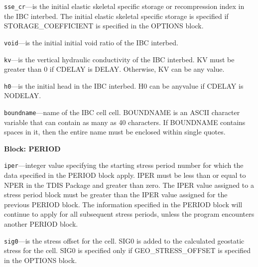 \begin{description}
\item \texttt{sse\_cr}---is the initial elastic skeletal specific storage or recompression index in the IBC interbed. The initial elastic skeletal specific storage is specified if STORAGE\_COEFFICIENT is specified in the OPTIONS block.

\item \texttt{void}---is the initial initial void ratio of the IBC interbed.

\item \texttt{kv}---is the vertical hydraulic conductivity of the IBC interbed. KV must be greater than 0 if CDELAY is DELAY. Otherwise, KV can be any value.

\item \texttt{h0}---is the initial head in the IBC interbed. H0 can be anyvalue if CDELAY is NODELAY.

\item \texttt{boundname}---name of the IBC cell cell.  BOUNDNAME is an ASCII character variable that can contain as many as 40 characters.  If BOUNDNAME contains spaces in it, then the entire name must be enclosed within single quotes.

\end{description}
\item \textbf{Block: PERIOD}

\begin{description}
\item \texttt{iper}---integer value specifying the starting stress period number for which the data specified in the PERIOD block apply.  IPER must be less than or equal to NPER in the TDIS Package and greater than zero.  The IPER value assigned to a stress period block must be greater than the IPER value assigned for the previous PERIOD block.  The information specified in the PERIOD block will continue to apply for all subsequent stress periods, unless the program encounters another PERIOD block.

\item \texttt{sig0}---is the stress offset for the cell. SIG0 is added to the calculated geostatic stress for the cell. SIG0 is specified only if GEO\_STRESS\_OFFSET is specified in the OPTIONS block.

\end{description}

